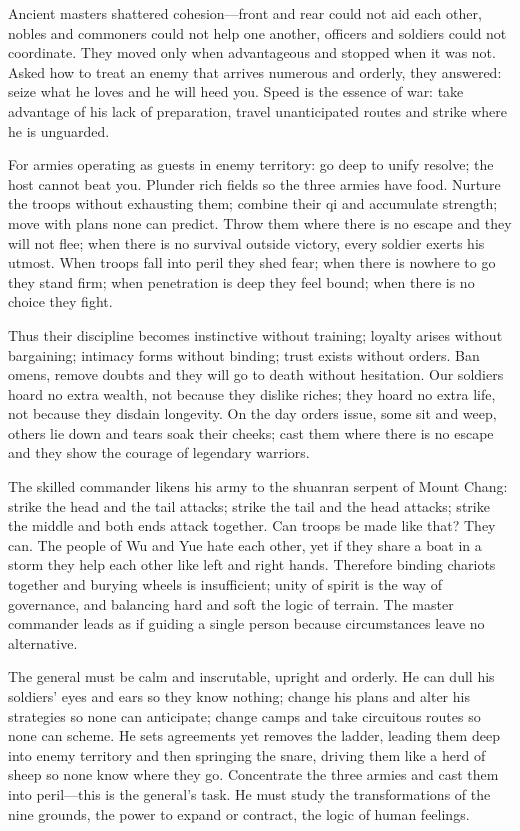\documentclass[12pt]{book}
\begin{document}
{Ancient masters shattered cohesion—front and rear could not aid each other, nobles and commoners could not help one another, officers and soldiers could not coordinate. They moved only when advantageous and stopped when it was not. Asked how to treat an enemy that arrives numerous and orderly, they answered: seize what he loves and he will heed you. Speed is the essence of war: take advantage of his lack of preparation, travel unanticipated routes and strike where he is unguarded.

For armies operating as guests in enemy territory: go deep to unify resolve; the host cannot beat you. Plunder rich fields so the three armies have food. Nurture the troops without exhausting them; combine their qi and accumulate strength; move with plans none can predict. Throw them where there is no escape and they will not flee; when there is no survival outside victory, every soldier exerts his utmost. When troops fall into peril they shed fear; when there is nowhere to go they stand firm; when penetration is deep they feel bound; when there is no choice they fight.

Thus their discipline becomes instinctive without training; loyalty arises without bargaining; intimacy forms without binding; trust exists without orders. Ban omens, remove doubts and they will go to death without hesitation. Our soldiers hoard no extra wealth, not because they dislike riches; they hoard no extra life, not because they disdain longevity. On the day orders issue, some sit and weep, others lie down and tears soak their cheeks; cast them where there is no escape and they show the courage of legendary warriors.

The skilled commander likens his army to the shuanran serpent of Mount Chang: strike the head and the tail attacks; strike the tail and the head attacks; strike the middle and both ends attack together. Can troops be made like that? They can. The people of Wu and Yue hate each other, yet if they share a boat in a storm they help each other like left and right hands. Therefore binding chariots together and burying wheels is insufficient; unity of spirit is the way of governance, and balancing hard and soft the logic of terrain. The master commander leads as if guiding a single person because circumstances leave no alternative.

The general must be calm and inscrutable, upright and orderly. He can dull his soldiers’ eyes and ears so they know nothing; change his plans and alter his strategies so none can anticipate; change camps and take circuitous routes so none can scheme. He sets agreements yet removes the ladder, leading them deep into enemy territory and then springing the snare, driving them like a herd of sheep so none know where they go. Concentrate the three armies and cast them into peril—this is the general’s task. He must study the transformations of the nine grounds, the power to expand or contract, the logic of human feelings.

}
\end{document}
